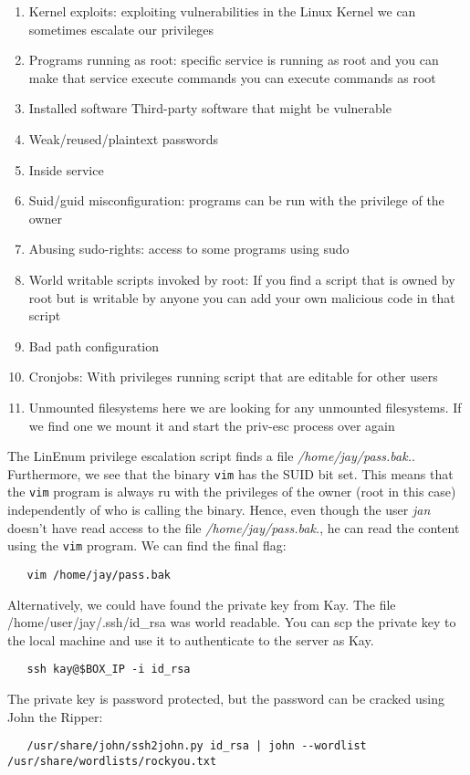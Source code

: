 \documentclass{article}
\begin{document}
\begin{enumerate}
\item Kernel exploits: exploiting vulnerabilities in the Linux Kernel we can sometimes escalate our privileges
\item Programs running as root: specific service is running as root and you can make that service execute commands you can execute commands as root
\item Installed software Third-party software that might be vulnerable
\item Weak/reused/plaintext passwords
\item Inside service
\item Suid/guid misconfiguration: programs can be run with the privilege of the owner
\item Abusing sudo-rights: access to some programs using sudo
\item World writable scripts invoked by root: If you find a script that is owned by root but is writable by anyone you can add your own malicious code in that script
\item Bad path configuration
\item Cronjobs: With privileges running script that are editable for other users
\item Unmounted filesystems here we are looking for any unmounted filesystems. If we find one we mount it and start the priv-esc process over again
\end{enumerate}

The LinEnum privilege escalation script finds a file \textit{/home/jay/pass.bak.}. Furthermore, we see that the binary \texttt{vim} has the SUID bit set. This means that the \texttt{vim} program is always ru with the privileges of the owner (root in this case) independently of who is calling the binary. Hence, even though the user \textit{jan} doesn't have read access to the file \textit{/home/jay/pass.bak.}, he can read the content using the \texttt{vim} program. We can find the final flag:

\begin{lstlisting}
   vim /home/jay/pass.bak
\end{lstlisting}

Alternatively, we could have found the private key from Kay. The file /home/user/jay/.ssh/id\_rsa was world readable. You can scp the private key to the local machine and use it to authenticate to the server as Kay. 

\begin{lstlisting}
   ssh kay@$BOX_IP -i id_rsa
\end{lstlisting}


The private key is password protected, but the password can be cracked using John the Ripper:

\begin{lstlisting}
   /usr/share/john/ssh2john.py id_rsa | john --wordlist /usr/share/wordlists/rockyou.txt
\end{lstlisting}
\end{document}
